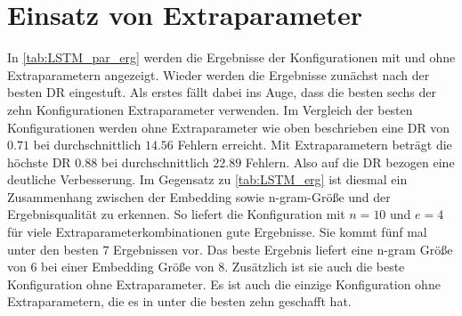 \section{Einsatz von Extraparameter}\label{sec:erg_LSTM_extra}
    In \autoref{tab:LSTM_par_erg} werden die Ergebnisse der Konfigurationen mit und ohne Extraparametern angezeigt. 
    Wieder werden die Ergebnisse zunächst nach der besten \ac{DR} eingestuft.
    Als erstes fällt dabei ins Auge, dass die besten sechs der zehn Konfigurationen Extraparameter verwenden.
    Im Vergleich der besten Konfigurationen werden ohne Extraparameter wie oben beschrieben eine \ac{DR} von $0.71$ bei durchschnittlich $14.56$ Fehlern erreicht.
    Mit Extraparametern beträgt die höchste \ac{DR} $0.88$ bei durchschnittlich $22.89$ Fehlern.
    Also auf die \ac{DR} bezogen eine deutliche Verbesserung.
    Im Gegensatz zu \autoref{tab:LSTM_erg} ist diesmal ein Zusammenhang zwischen der Embedding sowie n-gram-Größe und der Ergebnisqualität zu erkennen.
    So liefert die Konfiguration mit $n=10$ und $e=4$ für viele Extraparameterkombinationen gute Ergebnisse.
    Sie kommt fünf mal unter den besten $7$ Ergebnissen vor.
    Das beste Ergebnis liefert eine n-gram Größe von $6$ bei einer Embedding Größe von $8$.
    Zusätzlich ist sie auch die beste Konfiguration ohne Extraparameter.
    Es ist auch die einzige Konfiguration ohne Extraparametern, die es in unter die besten zehn geschafft hat.
